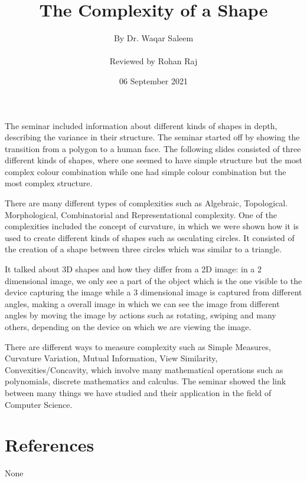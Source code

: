 \documentclass{article}
\title{The Complexity of a Shape} %
\author{By Dr. Waqar Saleem \\ \\ Reviewed by Rohan Raj} %
\date{06 September 2021} %
\begin{document}
\maketitle
The seminar included information about different kinds of shapes in depth, describing the variance in their structure. The seminar started off by showing the transition from a polygon to a human face. The following slides consisted of three different kinds of shapes, where one seemed to have simple structure but the most complex colour combination while one had simple colour combination but the most complex structure.

\par
There are many different types of complexities such as Algebraic, Topological. Morphological, Combinatorial and Representational complexity. One of the complexities included the concept of curvature, in which we were shown how it is used to create different kinds of shapes such as osculating circles. It consisted of the creation of a shape between three circles which was similar to a triangle.

\par
It talked about 3D shapes and how they differ from a 2D image: in a 2 dimensional image, we only see a part of the object which is the one visible to the device capturing the image while a 3 dimensional image is captured from different angles, making a overall image in which we can see the image from different angles by moving the image by actions such as rotating, swiping and many others, depending on the device on which we are viewing the
image.

\par
There are different ways to measure complexity such as Simple Measures, Curvature Variation, Mutual Information, View Similarity, Convexities/Concavity, which involve many mathematical operations such as polynomials, discrete mathematics and calculus. The seminar showed the link between many things we have studied and their application in the field of Computer Science. 


\section*{References}
None 
\end{document}
